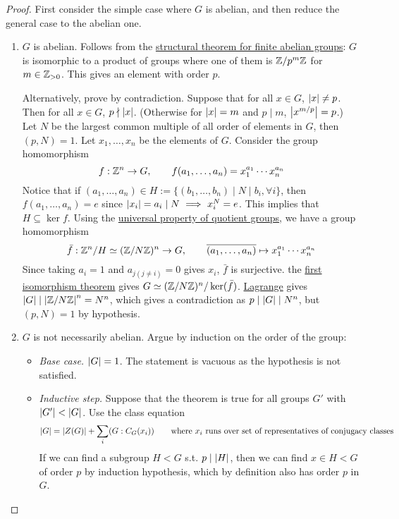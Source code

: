 \begin{proof}
    First consider the simple case where $G$ is abelian, and then reduce the general case to the abelian one.

    \begin{enumerate}
        \item[\bu{Case 1.}] $G$ is abelian. Follows from the \hyperref[thm: structural theorem]{structural theorem for finite abelian groups}: $G$ is isomorphic to a product of groups where one of them is $\mathbb{Z}/p^m\mathbb{Z}$ for $m \in \mathbb{Z}_{>0}$. This gives an element with order $p$.

        Alternatively, prove by contradiction. Suppose that for all $x \in G$, $\left|x\right| \neq p$. Then for all $x \in G$, $p \nmid \left|x\right|$. (Otherwise for $\left|x\right| = m$ and $p \mid m$, $\left|x^{m/p}\right| = p$.) Let $N$ be the largest common multiple of all order of elements in $G$, then $(p, N) = 1$. Let $x_1, \dots, x_n$ be the elements of $G$. Consider the group homomorphism 
        \[
            f: \mathbb{Z}^n \to G, \qquad f(a_1, \dots, a_n) = x_1^{a_1} \cdots x_n^{a_n}
        \]
        Notice that if $(a_1, \dots, a_n) \in H := \{(b_1, \dots, b_n) \mid N \mid b_i, \forall i\}$, then $f(a_1, \dots, a_n) = e$ since $\left|x_i\right| = a_i \mid N \ \Longrightarrow\  x_i^N = e$. This implies that $H \subseteq \ker f$. Using the \hyperref[prop: universal property of quotient group]{universal property of quotient groups}, we have a group homomorphism
        \[
            \bar{f}: \mathbb{Z}^n/H \simeq (\mathbb{Z}/N\mathbb{Z})^n \to G, \qquad \overline{(a_1, \dots, a_n)} \mapsto x_1^{a_1} \cdots x_n^{a_n}
        \]
        Since taking $a_i = 1$ and $a_{j(j \neq i)} = 0$ gives $x_i$, $\bar{f}$ is surjective. the \hyperref[thm: first isomorphism theorem]{first isomorphism theorem} gives $G \simeq (\mathbb{Z}/N\mathbb{Z})^n/\ker(\bar{f})$. \hyperref[thm: Lagrange]{Lagrange} gives $\left|G\right| \mid \left|\mathbb{Z}/N\mathbb{Z}\right|^n = N^n$, which gives a contradiction as $p \mid \left|G\right| \mid N^n$, but $(p, N) = 1$ by hypothesis.

        \item[\bu{Case 2.}] $G$ is not necessarily abelian. Argue by induction on the order of the group:
        \begin{itemize}
            \item \emph{Base case.} $\left|G\right| = 1$. The statement is vacuous as the hypothesis is not satisfied.
            \item \emph{Inductive step.} Suppose that the theorem is true for all groups $G'$ with $\left|G'\right| < \left|G\right|$. Use the class equation
            \[
                \left|G\right| = \left|Z(G)\right| + \sum_{i}(G : C_G(x_i)) \qquad \text{where $x_i$ runs over set of representatives of conjugacy classes}
            \]
            If we can find a subgroup $H < G$ s.t. $p \mid \left|H\right|$, then we can find $x \in H < G$ of order $p$ by induction hypothesis, which by definition also has order $p$ in $G$.


\end{itemize}
\end{enumerate}
\end{proof}
